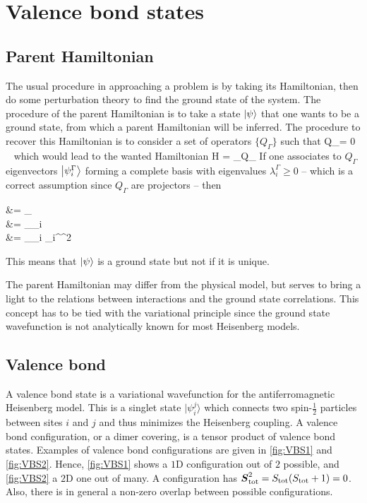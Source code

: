 \chapter{Valence bond states}

	\section{Parent Hamiltonian}

		The usual procedure in approaching a problem is by taking its Hamiltonian, then do some perturbation theory to find the ground state of the system. The procedure of the parent Hamiltonian is to take a state $\ket \psi$ that one wants to be a ground state, from which a parent Hamiltonian will be inferred. The procedure to recover this Hamiltonian is to consider a set of operators $\{Q_\Gamma\}$ such that
		\be Q_\Gamma \ket \psi = 0 \ \forall \Gamma \ee
		which would lead to the wanted Hamiltonian
		\be \mc H = \sum_\Gamma Q_\Gamma \ee
		If one associates to $Q_\Gamma$ eigenvectors $\ket{\psi_i^\Gamma}$ forming a complete basis with eigenvalues $\lambda_i^\Gamma \geq 0$ -- which is a correct assumption since $Q_\Gamma$ are projectors -- then
		\be \begin{split}  &= \sum_\Gamma {} \\ &= \sum_\Gamma \sum_i  \\ &= \sum_\Gamma \sum_i \lambda_i^\Gamma {}^2  \end{split} \ee
		This means that $\ket \psi$ is a ground state but not if it is unique.

		The parent Hamiltonian may differ from the physical model, but serves to bring a light to the relations between interactions and the ground state correlations. This concept has to be tied with the variational principle since the ground state wavefunction is not analytically known for most Heisenberg models.

	\section{Valence bond}

		A valence bond state is a variational wavefunction for the antiferromagnetic Heisenberg model. This is a singlet state $|\psi_i^j\rangle$ which connects two spin-$\frac{1}{2}$ particles between sites $i$ and $j$ and thus minimizes the Heisenberg coupling. A valence bond configuration, or a dimer covering, is a tensor product of valence bond states. Examples of valence bond configurations are given in \autoref{fig:VBS1} and \autoref{fig:VBS2}. Hence, \autoref{fig:VBS1} shows a $1$D configuration out of $2$ possible, and \autoref{fig:VBS2} a $2$D one out of many. A configuration has $\vb* S_\text{tot}^2 = S_\text{tot} (S_\text{tot} +1) =0$. Also, there is in general a non-zero overlap between possible configurations. 
		
